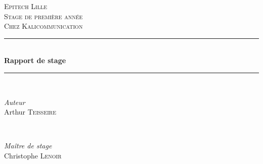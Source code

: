 \begin{titlepage}

\newcommand{\HRule}{\rule{\linewidth}{0.3mm}} %

\center %


\textsc{\LARGE Epitech Lille}\\[1.5cm] %
\textsc{\Large Stage de première année}\\[0.5cm] %
\textsc{\large Chez Kalicommunication}\\[0.5cm] %

\vspace*{1.5cm}


\HRule \\[0.4cm]
{ \huge \bfseries Rapport de stage}\\[0.4cm] %
\HRule \\[1.5cm]


\vspace*{0.5cm}
\begin{minipage}{0.4\textwidth}
\begin{flushleft} \large
\emph{Auteur}\\
Arthur \textsc{Teisseire} %
\end{flushleft}
\end{minipage}
~
\begin{minipage}{0.4\textwidth}
\begin{flushright} \large
\emph{Maître de stage} \\
Christophe \textsc{Lenoir} %
\end{flushright}
\end{minipage}\\[2cm]


\end{titlepage}
